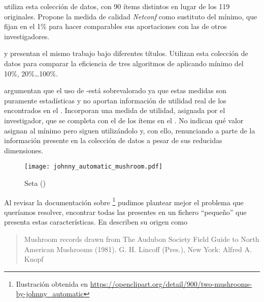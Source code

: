 \citet{HLeon-DesarrolloDeClasificadoresBasadosEnCAR-2011} utiliza esta colección de datos, con 90 ítems distintos en lugar de los 119 originales. Propone la medida de calidad \emph{Netconf} como sustituto del \soporte mínimo, que fijan en el 1\% para hacer comparables sus aportaciones con las de otros investigadores.

\citet{MalikRaheja-ImprovingPerformanceOfFrequentItemsetAlgorithm-2013} y \citet{RituArora-IntensificationOfExecutionOfFrequentItemSetAlgorithms-2014} presentan el mismo trabajo bajo diferentes títulos. Utilizan esta colección de datos para comparar la eficiencia de tres algoritmos de \ARM aplicando \soporte mínimo del 10\%, 20\%\ldots 100\%.

\citet{SahooKumarGoswami-AnAlgorithmForMiningHighUtilityClosedItemsetsAndGenerators-2014} argumentan que el uso de \soporte-\confianza está sobrevalorado ya que estas medidas son puramente estadísticas y no aportan información de utilidad real de los \itemsets encontrados en el \dataset. Incorporan una medida de utilidad, asignada por el investigador, que se completa con el \soporte de los ítems en el \dataset. No indican qué valor asignan al \soporte mínimo pero siguen utilizándolo y, con ello, renunciando a parte de la información presente en la colección de datos a pesar de sus reducidas dimensiones.

\begin{wrapfigure}{o}{0.22\textwidth}
  \centering
  \texttt{[image: johnny\_automatic\_mushroom.pdf]}
	\caption{Seta (\mushroom)}
	\label{fig:Seta}
\end{wrapfigure}
Al revisar la documentación sobre \mushroom\footnote{Ilustración obtenida en {\scriptsize\url{https://openclipart.org/detail/900/two-mushrooms-by-johnny_automatic}}} pudimos plantear mejor el problema que queríamos resolver, encontrar todas las \ARs presentes en un fichero "`pequeño"' que presenta estas características. En  describen su origen como
\begin{quote}
   Mushroom records drawn from The Audubon Society Field Guide to North American Mushrooms (1981). G. H. Lincoff (Pres.), New York: Alfred A. Knopf 
\end{quote}


